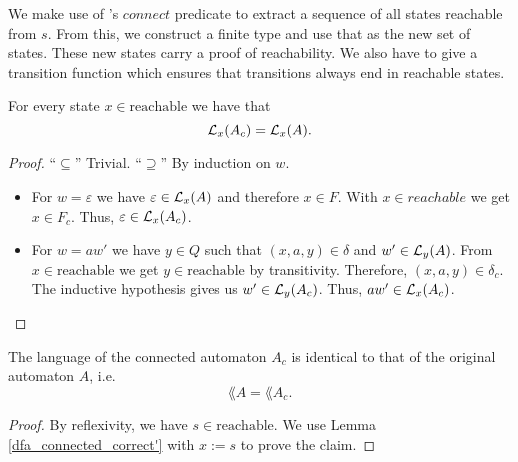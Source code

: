 We make use of \ssreflect's $connect$ predicate to extract a sequence of all states reachable from $s$. 
From this, we construct a finite type and use that as the new set of states. 
These new states carry a proof of reachability. %
We also have to give a transition function which ensures that transitions always end in reachable states.


\begin{lemma}
    \label{dfa_connected_correct'}
    For every state $x \in \mathrm{reachable}$ we have that
    \begin{equation*}
        \mathcal{L}_{x}(A_c) = \mathcal{L}_{x}(A).
    \end{equation*}
\end{lemma}
\begin{proof}
    ``$\subseteq$'' Trivial.
    ``$\supseteq$''
    By induction on $w$.
    \begin{itemize}
        \item
            For $w = \varepsilon$ we have $\varepsilon \in \mathcal{L}_{x}(A)$ and therefore $x \in F$. 
            With $x \in reachable$ we get $x \in F_c$. 
            Thus, $\varepsilon \in \mathcal{L}_{x}(A_c)$.
        \item
            For $w = a w'$ we have $y \in Q$ such that $(x, a, y) \in \delta$ and $w' \in \mathcal{L}_{y}(A)$.
            From $x \in \mathrm{reachable}$ we get $y \in \mathrm{reachable}$ by transitivity.
            Therefore, $(x,a,y) \in \delta_c$.
            The inductive hypothesis gives us $w' \in \mathcal{L}_{y}(A_c)$. 
            Thus, $a w' \in \mathcal{L}_{x}(A_c)$.
    \end{itemize}
\end{proof}

\begin{theorem}
    \label{dfa_connected_correct}
    The language of the connected automaton $A_c$ is identical to that of the original automaton $A$, i.e.
    \begin{equation*}
        \lang{A} = \lang{A_c}.        
    \end{equation*}
\end{theorem}

\begin{proof}
    By reflexivity, we have $s \in \mathrm{reachable}$. 
    We use Lemma \ref{dfa_connected_correct'} with $x := s$ to prove the claim.
\end{proof}


